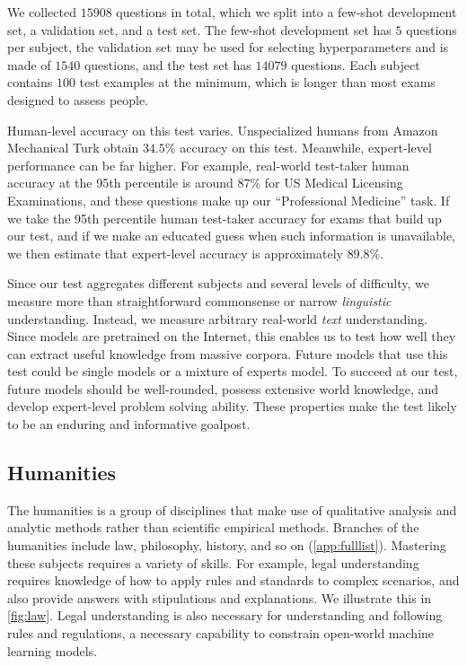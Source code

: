 We collected $15908$ questions in total, which we split into a few-shot development set, a validation set, and a test set. The few-shot development set has $5$ questions per subject, the validation set may be used for selecting hyperparameters and is made of $1540$ questions, and the test set has $14079$ questions. Each subject contains $100$ test examples at the minimum, which is longer than most exams designed to assess people.

Human-level accuracy on this test varies. Unspecialized humans from Amazon Mechanical Turk obtain $34.5\%$ accuracy on this test. Meanwhile, expert-level performance can be far higher. For example, real-world test-taker human accuracy at the 95th percentile is around $87\%$ for US Medical Licensing Examinations, and these questions make up our ``Professional Medicine'' task. If we take the 95th percentile human test-taker accuracy for exams that build up our test, and if we make an educated guess when such information is unavailable, we then estimate that expert-level accuracy is approximately $89.8\%$.

Since our test aggregates different subjects and several levels of difficulty, we measure more than straightforward commonsense or narrow \emph{linguistic} understanding. Instead, we measure arbitrary real-world \emph{text} understanding. Since models are pretrained on the Internet, this enables us to test how well they can extract useful knowledge from massive corpora. Future models that use this test could be single models or a mixture of experts model. To succeed at our test, future models should be well-rounded, possess extensive world knowledge, and develop expert-level problem solving ability. These properties make the test likely to be an enduring and informative goalpost.

\subsection{Humanities}
The humanities is a group of disciplines that make use of qualitative analysis and analytic methods rather than scientific empirical methods. Branches of the humanities include law, philosophy, history, and so on (\ref{app:fulllist}). Mastering these subjects requires a variety of skills. For example, legal understanding requires knowledge of how to apply rules and standards to complex scenarios, and also provide answers with stipulations and explanations. We illustrate this in \ref{fig:law}.
Legal understanding is also necessary for understanding and following rules and regulations, a necessary capability to constrain open-world machine learning models.

